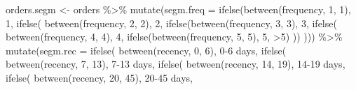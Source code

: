 \documentclass[
]{book}
\newenvironment{Shaded}{\begin{snugshade}}{\end{snugshade}}
\newcommand{\AttributeTok}[1]{\textcolor[rgb]{0.77,0.63,0.00}{#1}}
\newcommand{\DecValTok}[1]{\textcolor[rgb]{0.00,0.00,0.81}{#1}}
\newcommand{\FunctionTok}[1]{\textcolor[rgb]{0.00,0.00,0.00}{#1}}
\newcommand{\NormalTok}[1]{#1}
\newcommand{\OtherTok}[1]{\textcolor[rgb]{0.56,0.35,0.01}{#1}}
\newcommand{\SpecialCharTok}[1]{\textcolor[rgb]{0.00,0.00,0.00}{#1}}
\newcommand{\StringTok}[1]{\textcolor[rgb]{0.31,0.60,0.02}{#1}}
\begin{document}
\begin{Shaded}
\begin{Highlighting}[]
\NormalTok{orders.segm }\OtherTok{\textless{}{-}}\NormalTok{ orders }\SpecialCharTok{\%\textgreater{}\%}
    \FunctionTok{mutate}\NormalTok{(}\AttributeTok{segm.freq =} \FunctionTok{ifelse}\NormalTok{(}\FunctionTok{between}\NormalTok{(frequency, }\DecValTok{1}\NormalTok{, }\DecValTok{1}\NormalTok{), }\StringTok{\textquotesingle{}1\textquotesingle{}}\NormalTok{,}
                              \FunctionTok{ifelse}\NormalTok{(}
                                  \FunctionTok{between}\NormalTok{(frequency, }\DecValTok{2}\NormalTok{, }\DecValTok{2}\NormalTok{), }\StringTok{\textquotesingle{}2\textquotesingle{}}\NormalTok{,}
                                  \FunctionTok{ifelse}\NormalTok{(}\FunctionTok{between}\NormalTok{(frequency, }\DecValTok{3}\NormalTok{, }\DecValTok{3}\NormalTok{), }\StringTok{\textquotesingle{}3\textquotesingle{}}\NormalTok{,}
                                         \FunctionTok{ifelse}\NormalTok{(}
                                             \FunctionTok{between}\NormalTok{(frequency, }\DecValTok{4}\NormalTok{, }\DecValTok{4}\NormalTok{), }\StringTok{\textquotesingle{}4\textquotesingle{}}\NormalTok{,}
                                             \FunctionTok{ifelse}\NormalTok{(}\FunctionTok{between}\NormalTok{(frequency, }\DecValTok{5}\NormalTok{, }\DecValTok{5}\NormalTok{), }\StringTok{\textquotesingle{}5\textquotesingle{}}\NormalTok{, }\StringTok{\textquotesingle{}\textgreater{}5\textquotesingle{}}\NormalTok{)}
\NormalTok{                                         ))}
\NormalTok{                              ))) }\SpecialCharTok{\%\textgreater{}\%}
    \FunctionTok{mutate}\NormalTok{(}\AttributeTok{segm.rec =} \FunctionTok{ifelse}\NormalTok{(}
        \FunctionTok{between}\NormalTok{(recency, }\DecValTok{0}\NormalTok{, }\DecValTok{6}\NormalTok{),}
        \StringTok{\textquotesingle{}0{-}6 days\textquotesingle{}}\NormalTok{,}
        \FunctionTok{ifelse}\NormalTok{(}
            \FunctionTok{between}\NormalTok{(recency, }\DecValTok{7}\NormalTok{, }\DecValTok{13}\NormalTok{),}
            \StringTok{\textquotesingle{}7{-}13 days\textquotesingle{}}\NormalTok{,}
            \FunctionTok{ifelse}\NormalTok{(}
                \FunctionTok{between}\NormalTok{(recency, }\DecValTok{14}\NormalTok{, }\DecValTok{19}\NormalTok{),}
                \StringTok{\textquotesingle{}14{-}19 days\textquotesingle{}}\NormalTok{,}
                \FunctionTok{ifelse}\NormalTok{(}
                    \FunctionTok{between}\NormalTok{(recency, }\DecValTok{20}\NormalTok{, }\DecValTok{45}\NormalTok{),}
                    \StringTok{\textquotesingle{}20{-}45 days\textquotesingle{}}\NormalTok{,}

\end{Highlighting}
\end{Shaded}
\end{document}
